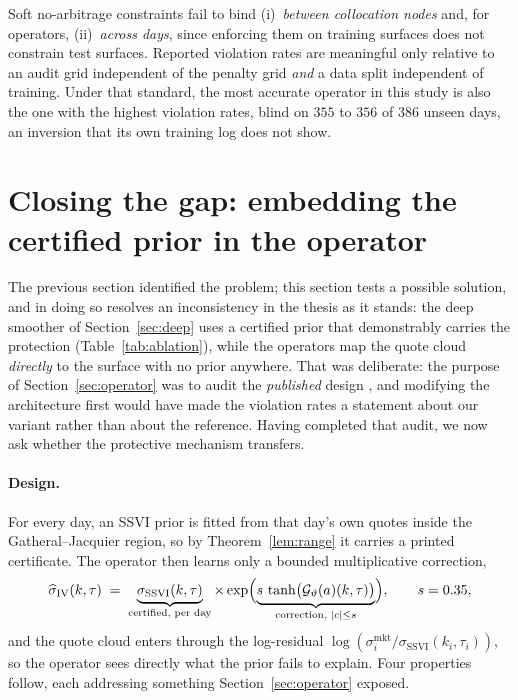 \begin{finding}\label{find:transversal}
Soft no-arbitrage constraints fail to bind (i)~\emph{between collocation nodes} and, for
operators, (ii)~\emph{across days}, since enforcing them on training surfaces does not constrain
test surfaces. Reported violation rates are meaningful only relative to an audit grid
independent of the penalty grid \emph{and} a data split independent of training. Under that
standard, the most accurate operator in this study is also the one with the highest violation
rates, blind on $355$ to $356$ of $386$ unseen days, an inversion that its own training log does
not show.
\end{finding}

\section{Closing the gap: embedding the certified prior in the operator}
\label{sec:prioroperator}

The previous section identified the problem; this section tests a possible solution, and in
doing so resolves an inconsistency in the thesis as it stands: the deep smoother of
Section~\ref{sec:deep} uses a certified prior that demonstrably carries the protection
(Table~\ref{tab:ablation}), while the operators map the quote cloud \emph{directly} to the
surface with no prior anywhere. That was deliberate: the purpose of Section~\ref{sec:operator}
was to audit the \emph{published} design \cite{wiedemann2025}, and modifying the architecture
first would have made the violation rates a statement about our variant rather than about the
reference. Having completed that audit, we now ask whether the protective mechanism transfers.

\paragraph{Design.} For every day, an SSVI prior is fitted from that day's own quotes inside the
Gatheral--Jacquier region, so by Theorem~\ref{lem:range} it carries a printed certificate. The
operator then learns only a bounded multiplicative correction,
\begin{equation}\label{eq:prioroperator}
\widehat\sigma_{\mathrm{IV}}(k,\tau)\;=\;
\underbrace{\sigma_{\mathrm{SSVI}}(k,\tau)}_{\text{certified, per day}}\times
\exp\Bigl(\underbrace{s\,\tanh\bigl(\mathcal G_\vartheta(a)(k,\tau)\bigr)}_{\text{correction, }|c|\le s}\Bigr),
\qquad s=0.35,
\end{equation}
and the quote cloud enters through the log-residual
$\log(\sigma^{\mathrm{mkt}}_i/\sigma_{\mathrm{SSVI}}(k_i,\tau_i))$, so the operator sees
directly what the prior fails to explain. Four properties follow, each addressing something
Section~\ref{sec:operator} exposed.

